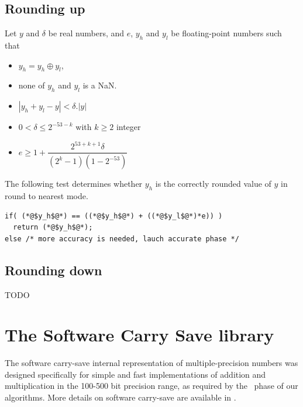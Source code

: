 \subsection{Rounding up}

\begin{theorem}
  Let $y$ and $\delta$ be real numbers, and $e$, $y_h$ and $y_l$ be
  floating-point numbers such that 
  \begin{itemize}
  \item $y_h=y_h\oplus y_l$,
  \item none of $y_h$ and $y_l$ is a  NaN.
  \item $|y_h+y_l - y| < \delta.|y|$
  \item $0< \delta \le 2^{-53-k}$ with $k\ge 2$ integer
  \item $e\ge 1+  \dfrac{2^{53+k+1}\delta}{(2^{k}-1)(1-2^{-53})}$
\end{itemize}

The following test determines whether $y_h$ is the
  correctly rounded value of $y$ in  round to nearest mode.

\begin{lstlisting}[label={roundingtonearest},
  caption={Test for correct rounding to nearest},
  firstnumber=1]
if( (*@$y_h$@*) == ((*@$y_h$@*) + ((*@$y_l$@*)*e)) )
  return (*@$y_h$@*);
else /* more accuracy is needed, lauch accurate phase */
\end{lstlisting}
\end{theorem}

\subsection{Rounding down}

TODO







\section{The Software Carry Save library}

The software carry-save internal representation of multiple-precision
numbers was designed specifically for simple and fast implementations
of addition and multiplication in the 100-500 bit precision range, as
required by the \accurate\ phase of our algorithms. More details on
software carry-save are available in \cite{DefDin2002,DinDef2003}.

